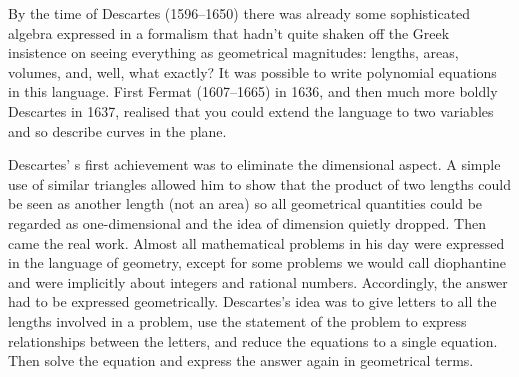 By the time of Descartes (1596--1650) there was already some sophisticated algebra expressed in a formalism that hadn't quite shaken off the Greek insistence on seeing everything as geometrical magnitudes: lengths, areas, volumes, and, well, what exactly? It was possible to write polynomial equations in this language. First Fermat (1607--1665) in 1636, and then much more boldly Descartes in 1637, realised that you could extend the language to two variables and so describe curves in the plane.

Descartes' s first achievement was to eliminate the dimensional aspect. A simple use of similar triangles allowed him to show that the product of two lengths could be seen as another length (not an area) so all geometrical quantities could be regarded as one-dimensional and the idea of dimension quietly dropped. Then came the real work. Almost all mathematical problems in his day were expressed in the language of geometry, except for some problems we would call diophantine and were implicitly about integers and rational numbers. Accordingly, the answer had to be expressed geometrically. Descartes's idea was to give letters to all the lengths involved in a problem, use the statement of the problem to express relationships between the letters, and reduce the equations to a single equation. Then solve the equation and express the answer again in geometrical terms.  


